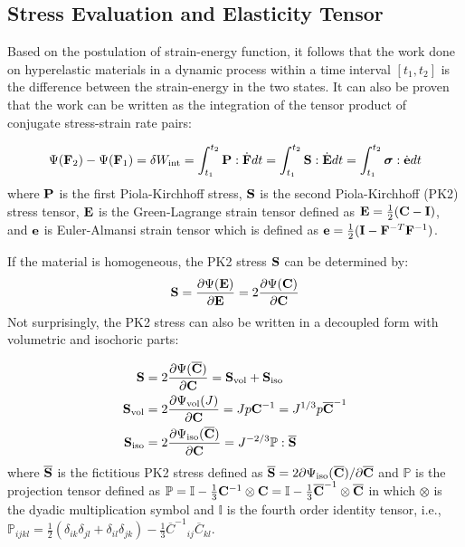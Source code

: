 %
\subsection{Stress Evaluation and Elasticity Tensor} \label{general_stress}
Based on the postulation of strain-energy function, it follows that the work done on hyperelastic materials in a dynamic process within a time interval $[t_1, t_2]$ is the difference between the strain-energy in the two states. It can also be proven that the work can be written as the integration of the tensor product of conjugate stress-strain rate pairs:

\begin{equation}
\Psi(\bold{F}_2) - \Psi(\bold{F}_1) = \delta{W_\mathrm{int}} = \int_{t_1}^{t_2}\bold{P}:\dot{\bold{F}}dt = \int_{t_1}^{t_2}\bold{S}:\dot{\bold{E}}dt = 
\int_{t_1}^{t_2}\boldsymbol{\sigma}:\dot{\bold{e}}dt
\end{equation}
where $\bold{P}$ is the first Piola-Kirchhoff stress, $\bold{S}$ is the second Piola-Kirchhoff (PK2) stress tensor, $\bold{E}$ is the Green-Lagrange strain tensor defined as $\bold{E} = \frac{1}{2}(\bold{C} - \bold{I})$, and $\bold{e}$ is Euler-Almansi strain tensor which is defined as $\bold{e} = \frac{1}{2}( \bold{I} - {\bold{F}}^{-T}{\bold{F}}^{-1} )$.

If the material is homogeneous, the PK2 stress $\bold{S}$ can be determined by: 
\begin{equation}
\bold{S}  = \frac{\partial\Psi(\bold{E})}{\partial{\bold{E}}} = 2\frac{\partial\Psi(\bold{C})}{\partial{\bold{C}}}\end{equation}
Not surprisingly, the PK2 stress can also be written in a decoupled form with volumetric and isochoric parts:

\begin{subequations}
\label{S}
\begin{align}
\bold{S} &=  2\frac{\partial{\Psi(\overline{\bold{C}})}}{\partial{\bold{C}}} = \bold{S}_\mathrm{vol}  + \bold{S}_\mathrm{iso} 
\label {Stotal} \\
\bold{S}_\mathrm{vol} &= 2\frac{\partial{\Psi_\mathrm{vol}(J)}}{\partial{\bold{C}}} = Jp{\bold{C}} ^{-1} = J^{1/3}p{\overline{\bold{C}}}^{-1} 
\label{Svol} \\
\bold{S}_\mathrm{iso}  &= 2\frac{\partial{\Psi_\mathrm{iso}({\overline{\bold{C}})}}}{\partial{\bold{C}}} = J^{-2/3}\mathbb{P}:\overline{\bold{S}}
\label{Siso}
\end{align}
\end{subequations}
where  $\overline{\bold{S}}$ is the fictitious PK2 stress defined as
$\overline{\bold{S}} = 2{\partial\Psi_\mathrm{iso}({\overline{\bold{C}})}} / {\partial\overline{\bold{C}}}$
and $\mathbb{P}$ is the projection tensor defined as $\mathbb{P} = \mathbb{I} - \frac{1}{3}\bold{C}^{-1} \otimes \bold{C} = \mathbb{I} - \frac{1}{3}\overline{\bold{C}}^{-1} \otimes \overline{\bold{C}} $ in which $\otimes$ is the dyadic multiplication symbol and $\mathbb{I}$ is the fourth order identity tensor, i.e.,  $\mathbb{P}_{ijkl} =  \frac{1}{2}(\delta_{ik}\delta_{jl} + \delta_{il}\delta_{jk}) - \frac{1}{3} {\overline{{C}}^{-1}}_{ij} {\overline{C}}_{kl}$.

